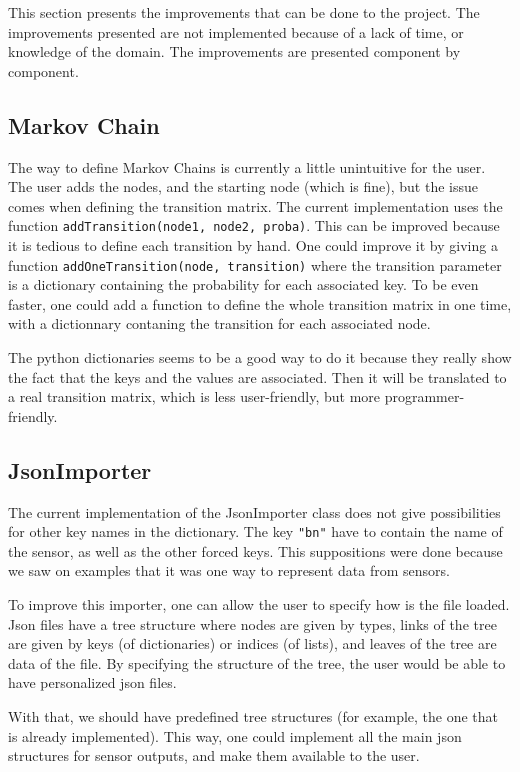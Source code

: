 
This section presents the improvements that can be done to the project. The improvements presented are not implemented because of a lack of time, or knowledge of the domain. The improvements are presented component by component.

\subsection{Markov Chain}

\label{improvement_MC}

The way to define Markov Chains is currently a little unintuitive for the user. The user adds the nodes, and the starting node (which is fine), but the issue comes when defining the transition matrix. The current implementation uses the function \verb!addTransition(node1, node2, proba)!.
This can be improved because it is tedious to define each transition by hand. One could improve it by giving a function \verb!addOneTransition(node, transition)! where the transition parameter is a dictionary containing the probability for each associated key. To be even faster, one could add a function to define the whole transition matrix in one time, with a dictionnary contaning the transition for each associated node.

The python dictionaries seems to be a good way to do it because they really show the fact that the keys and the values are associated. Then it will be translated to a real transition matrix, which is less user-friendly, but more programmer-friendly.


\subsection{JsonImporter}

\label{imprevoment_jsonimporter}

The current implementation of the JsonImporter class does not give possibilities for other key names in the dictionary. The key \verb!"bn"! have to contain the name of the sensor, as well as the other forced keys. This suppositions were done because we saw on examples that it was one way to represent data from sensors.

To improve this importer, one can allow the user to specify how is the file loaded. Json files have a tree structure where nodes are given by types, links of the tree are given by keys (of dictionaries) or indices (of lists), and leaves of the tree are data of the file. By specifying the structure of the tree, the user would be able to have personalized json files.

With that, we should have predefined tree structures (for example, the one that is already implemented). This way, one could implement all the main json structures for sensor outputs, and make them available to the user.

